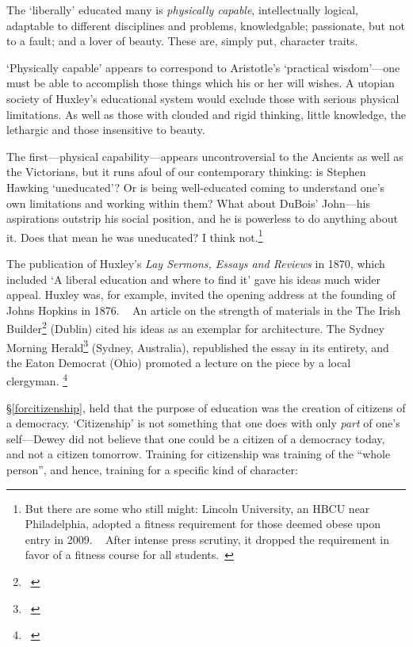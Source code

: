The `liberally' educated many is \emph{physically capable}, intellectually logical, adaptable to different disciplines and problems, knowledgable; passionate, but not to a fault; and a lover of beauty. These are, simply put, character traits. 

`Physically capable' appears to correspond to Aristotle's `practical wisdom'---one must be able to accomplish those things which his or her will wishes. A utopian society of Huxley's educational system would exclude those with serious physical limitations. As well as those with clouded and rigid thinking, little knowledge, the lethargic and those insensitive to beauty.

The first---physical capability---appears uncontroversial to the Ancients as well as the Victorians, but it runs afoul of our contemporary thinking: is Stephen Hawking `uneducated'? Or is being well-educated coming to understand one's own limitations and working within them? What about DuBois' John---his aspirations outstrip his social position, and he is powerless to do anything about it. Does that mean he was uneducated? I think not.\footnote{But there are some who still might: Lincoln University, an HBCU near Philadelphia, adopted a fitness requirement for those deemed obese upon entry in 2009. ~\citep{Anonymous:2009tl} After intense press scrutiny, it dropped the requirement in favor of a fitness course for all students.~\citep{Ashburn:2009ta}}

The publication of Huxley's \emph{Lay Sermons, Essays and Reviews} in 1870, which included `A liberal education and where to find it' gave his ideas much wider appeal. Huxley was, for example, invited the opening address at the founding of Johns Hopkins in 1876. ~\citep{Huxley:1876ud} An article on the strength of materials in the The Irish Builder\footnote{~\citep{Altchison:1871wh}} (Dublin) cited his ideas as an exemplar for architecture. The Sydney Morning Herald\footnote{~\citep{Huxley:1868wy}} (Sydney, Australia), republished the essay in its entirety, and the Eaton Democrat (Ohio) promoted a lecture on the piece by a local clergyman. \footnote{~\citep{Unknown:1883un}}

  \S\ref{forcitizenship}, held that the purpose of education was the creation of citizens of a democracy. `Citizenship' is not something that one does with only \emph{part} of one's self---Dewey did not believe that one could be a citizen of a democracy today, and not a citizen tomorrow. Training for citizenship was training of the ``whole person'', and hence, training for a specific kind of character:

